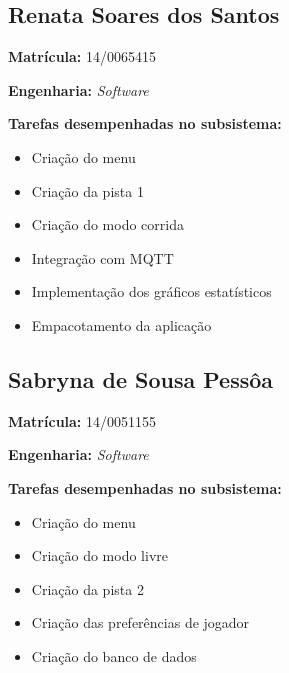 \subsection{Renata Soares dos Santos}

\textbf{Matrícula:} 14/0065415

\textbf{Engenharia:} \textit{Software}

\textbf{Tarefas desempenhadas no subsistema:}

\begin{itemize}
\item Criação do menu
\item Criação da pista 1
\item Criação do modo corrida
\item Integração com MQTT
\item Implementação dos gráficos estatísticos
\item Empacotamento da aplicação
\end{itemize}


\subsection{Sabryna de Sousa Pessôa}

\textbf{Matrícula:} 14/0051155

\textbf{Engenharia:} \textit{Software}

\textbf{Tarefas desempenhadas no subsistema:}

\begin{itemize}
\item Criação do menu
\item Criação do modo livre
\item Criação da pista 2
\item Criação das preferências de jogador
\item Criação do banco de dados
\end{itemize}
